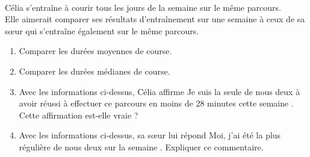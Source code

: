 \begin{activite}
   \ \\ [-16mm]
   \begin{QCM}
      Célia s’entraîne à courir tous les jours de la semaine sur le même parcours. \\
      Elle aimerait comparer ses résultats d’entraînement sur une semaine à ceux de sa sœur qui s’entraîne également sur le même parcours.
      \begin{center}
         \quad
      \end{center}
      \begin{enumerate}
         \item Comparer les durées moyennes de course.
         \item Comparer les durées médianes de course.
         \item Avec les informations ci-dessus, Célia affirme \og Je suis la seule de nous deux à avoir réussi à effectuer ce parcours en moins de 28 minutes cette semaine \fg. Cette affirmation est-elle vraie ?   
         \item Avec les informations ci-dessus, sa sœur lui répond \og Moi, j’ai été la plus régulière de nous deux sur la semaine \fg. Expliquer ce commentaire.    
      \end{enumerate}
   \end{QCM}
   

\end{activite}
